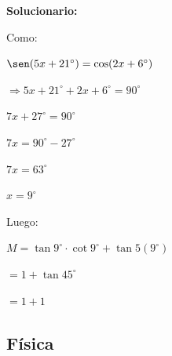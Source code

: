 \begin{enumerate}[resume]
	\vspace{2mm}
	\textbf{Solucionario:}
	
	Como:
	
	$\sen(5x+21^\circ)=\cos(2x+6^\circ)$
	
	$\Rightarrow 5x+21^\circ+2x+6^\circ=90^\circ$
	
	$7x+27^\circ=90^\circ$
	
	$7x=90^\circ-27^\circ$
	
	$7x=63^\circ$
	
	$x=9^\circ$
	
	Luego:
	
	$M=\tan 9^\circ\cdot \cot 9^\circ+\tan 5(9^\circ)$
	
	$=1+\tan 45^\circ$
	
	$=1+1$
	
	
	\vspace{6mm}
\end{enumerate}

\subsection*{Física}

